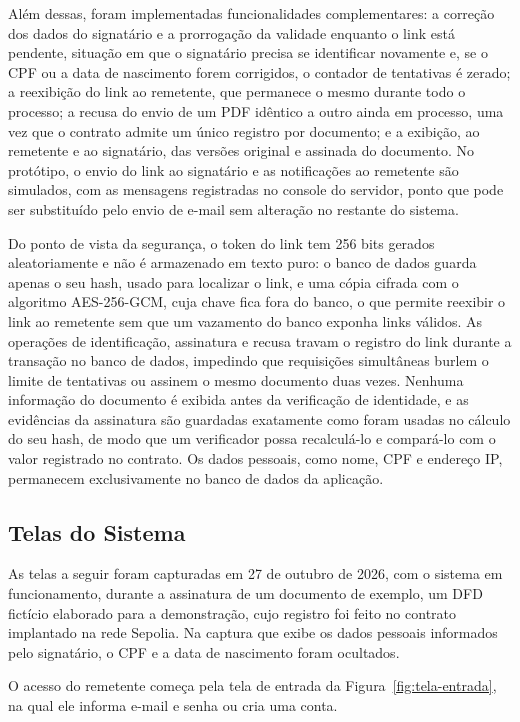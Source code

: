 \documentclass[
    12pt,
    a4paper,
    oneside,
    chapter=TITLE,
    section=TITLE,
    subsection=TITLE,
    subsubsection=TITLE,
    sumario=tradicional,
    english,
    brazil
]{abntex2}
\begin{document}
Além dessas, foram implementadas funcionalidades complementares: a correção dos dados do signatário e a prorrogação da validade enquanto o link está pendente, situação em que o signatário precisa se identificar novamente e, se o CPF ou a data de nascimento forem corrigidos, o contador de tentativas é zerado; a reexibição do link ao remetente, que permanece o mesmo durante todo o processo; a recusa do envio de um PDF idêntico a outro ainda em processo, uma vez que o contrato admite um único registro por documento; e a exibição, ao remetente e ao signatário, das versões original e assinada do documento. No protótipo, o envio do link ao signatário e as notificações ao remetente são simulados, com as mensagens registradas no console do servidor, ponto que pode ser substituído pelo envio de e-mail sem alteração no restante do sistema.

Do ponto de vista da segurança, o token do link tem 256 bits gerados aleatoriamente e não é armazenado em texto puro: o banco de dados guarda apenas o seu hash, usado para localizar o link, e uma cópia cifrada com o algoritmo AES-256-GCM, cuja chave fica fora do banco, o que permite reexibir o link ao remetente sem que um vazamento do banco exponha links válidos. As operações de identificação, assinatura e recusa travam o registro do link durante a transação no banco de dados, impedindo que requisições simultâneas burlem o limite de tentativas ou assinem o mesmo documento duas vezes. Nenhuma informação do documento é exibida antes da verificação de identidade, e as evidências da assinatura são guardadas exatamente como foram usadas no cálculo do seu hash, de modo que um verificador possa recalculá-lo e compará-lo com o valor registrado no contrato. Os dados pessoais, como nome, CPF e endereço IP, permanecem exclusivamente no banco de dados da aplicação.

\subsection{Telas do Sistema}
\label{sec:telas}

As telas a seguir foram capturadas em 27 de outubro de 2026, com o sistema em funcionamento, durante a assinatura de um documento de exemplo, um DFD fictício elaborado para a demonstração, cujo registro foi feito no contrato implantado na rede Sepolia. Na captura que exibe os dados pessoais informados pelo signatário, o CPF e a data de nascimento foram ocultados.

O acesso do remetente começa pela tela de entrada da Figura~\ref{fig:tela-entrada}, na qual ele informa e-mail e senha ou cria uma conta.
\end{document}

